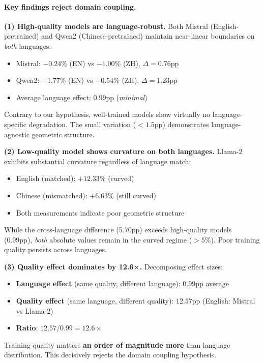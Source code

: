 \documentclass[11pt]{article}
\begin{document}
\paragraph{Key findings reject domain coupling.}

\textbf{(1) High-quality models are language-robust.} Both Mistral (English-pretrained) and Qwen2 (Chinese-pretrained) maintain near-linear boundaries on \textit{both} languages:
\begin{itemize}
\item Mistral: $-0.24\%$ (EN) vs $-1.00\%$ (ZH), $\Delta = 0.76$pp
\item Qwen2: $-1.77\%$ (EN) vs $-0.54\%$ (ZH), $\Delta = 1.23$pp  
\item Average language effect: $0.99$pp (\textit{minimal})
\end{itemize}

Contrary to our hypothesis, well-trained models show virtually no language-specific degradation. The small variation ($<1.5$pp) demonstrates language-agnostic geometric structure.

\textbf{(2) Low-quality model shows curvature on both languages.} Llama-2 exhibits substantial curvature regardless of language match:
\begin{itemize}
\item English (matched): $+12.33\%$ (curved)
\item Chinese (mismatched): $+6.63\%$ (still curved)
\item Both measurements indicate poor geometric structure
\end{itemize}

While the cross-language difference (5.70pp) exceeds high-quality models (0.99pp), \textit{both} absolute values remain in the curved regime ($>5\%$). Poor training quality persists across languages.

\textbf{(3) Quality effect dominates by 12.6×.} Decomposing effect sizes:
\begin{itemize}
\item \textbf{Language effect} (same quality, different language): $0.99$pp average
\item \textbf{Quality effect} (same language, different quality): $12.57$pp (English: Mistral vs Llama-2)
\item \textbf{Ratio}: $12.57 / 0.99 = 12.6\times$
\end{itemize}

Training quality matters \textbf{an order of magnitude more} than language distribution. This decisively rejects the domain coupling hypothesis.
\end{document}
